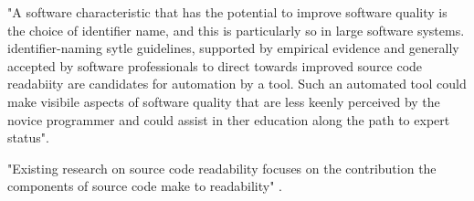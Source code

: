 "A software characteristic that has the potential to improve software quality is the choice of
identifier name, and this is particularly so in large software systems.
identifier-naming sytle guidelines, supported by empirical evidence and generally accepted by
software professionals to direct towards improved source code readabiity are candidates for
automation by a tool.
Such an automated tool could make visibile aspects of software quality that are less keenly
perceived by the novice programmer and could assist in ther education along the path to
expert status"\cite{Relf04}.

"Existing research on source code readability focuses on the contribution the
components of source code make to readability" \cite{Buse2008}.

